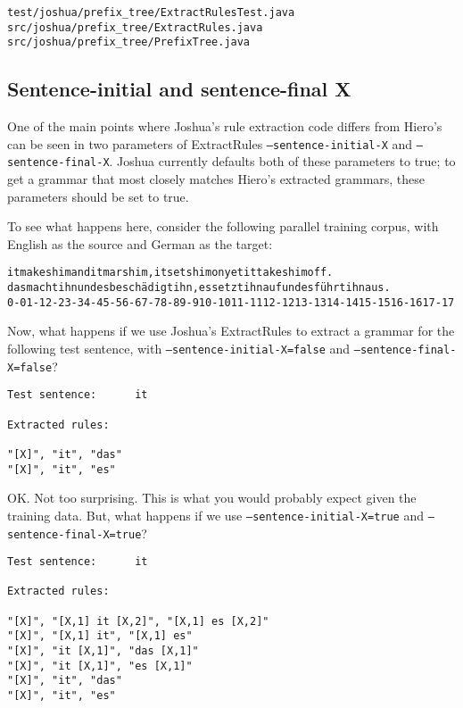 \begin{verbatim}
test/joshua/prefix_tree/ExtractRulesTest.java
src/joshua/prefix_tree/ExtractRules.java
src/joshua/prefix_tree/PrefixTree.java
\end{verbatim}


\subsection{Sentence-initial and sentence-final X}

One of the main points where Joshua's rule extraction code differs from Hiero's can be seen in two parameters of ExtractRules {\tt --sentence-initial-X} and {\tt --sentence-final-X}. Joshua currently defaults both of these parameters to true; to get a grammar that most closely matches Hiero's extracted grammars, these parameters should be set to true.

To see what happens here, consider the following parallel training corpus, with English as the source and German as the target:

\begin{alltt}
it makes him and it mars him , it sets him on yet it takes him off .
das macht ihn und es besch\"adigt ihn , es setzt ihn auf und es f\"uhrt ihn aus .
0-0 1-1 2-2 3-3 4-4 5-5 6-6 7-7 8-8 9-9 10-10 11-11 12-12 13-13 14-14 15-15 16-16 17-17
\end{alltt}

Now, what happens if we use Joshua's ExtractRules to extract a grammar for the following test sentence, with {\tt --sentence-initial-X=false} and {\tt --sentence-final-X=false}?

\begin{verbatim}
Test sentence:		it

Extracted rules:

"[X]", "it", "das"
"[X]", "it", "es"
\end{verbatim}

OK. Not too surprising. This is what you would probably expect given the training data. But, what happens if we use {\tt --sentence-initial-X=true} and {\tt --sentence-final-X=true}?

\begin{verbatim}
Test sentence:		it

Extracted rules:

"[X]", "[X,1] it [X,2]", "[X,1] es [X,2]"
"[X]", "[X,1] it", "[X,1] es"
"[X]", "it [X,1]", "das [X,1]"
"[X]", "it [X,1]", "es [X,1]"
"[X]", "it", "das"
"[X]", "it", "es"
\end{verbatim}


